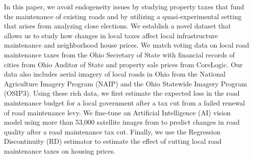 In this paper, we avoid endogeneity issues by studying property taxes that fund the maintenance of existing roads and by utilizing a quasi-experimental setting that arises from analyzing close elections. We establish a novel dataset that allows us to study how changes in local taxes affect local infrastructure maintenance and neighborhood house prices. We match voting data on local road maintenance taxes from the Ohio Secretary of State with financial records of cities from Ohio Auditor of State and property sale prices from CoreLogic. Our data also includes aerial imagery of local roads in Ohio from the National Agriculture Imagery Program (NAIP) and the Ohio Statewide Imagery Program (OSIP3). Using these rich data, we first estimate the expected loss in the road maintenance budget for a local government after a tax cut from a failed renewal of road maintenance levy. We fine-tune an Artificial Intelligence (AI) vision model using more than 53,000 satellite images from \cite{brewer2021} to predict changes in road quality after a road maintenance tax cut. Finally, we use the Regression Discontinuity (RD) estimator to estimate the effect of cutting local road maintenance taxes on housing prices.


